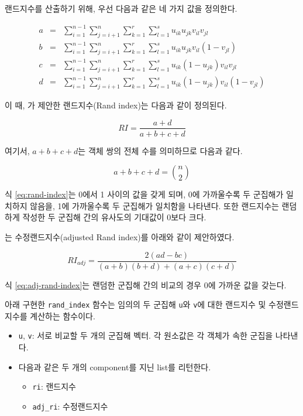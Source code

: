 \documentclass[
]{book}
\providecommand{\tightlist}{%
  \setlength{\itemsep}{0pt}\setlength{\parskip}{0pt}}
\begin{document}
랜드지수를 산출하기 위해, 우선 다음과 같은 네 가지 값을 정의한다.

\begin{eqnarray*}
a &=& \sum_{i = 1}^{n - 1} \sum_{j = i + 1}^{n} \sum_{k = 1}^{r} \sum_{l = 1}^{s} u_{ik} u_{jk} v_{il} v_{jl}\\
b &=& \sum_{i = 1}^{n - 1} \sum_{j = i + 1}^{n} \sum_{k = 1}^{r} \sum_{l = 1}^{s} u_{ik} u_{jk} v_{il} (1 - v_{jl})\\
c &=& \sum_{i = 1}^{n - 1} \sum_{j = i + 1}^{n} \sum_{k = 1}^{r} \sum_{l = 1}^{s} u_{ik} (1 - u_{jk}) v_{il} v_{jl}\\
d &=& \sum_{i = 1}^{n - 1} \sum_{j = i + 1}^{n} \sum_{k = 1}^{r} \sum_{l = 1}^{s} u_{ik} (1 - u_{jk}) v_{il} (1 - v_{jl})
\end{eqnarray*}

이 때, \citet{rand1971objective} 가 제안한 랜드지수(Rand index)는 다음과 같이 정의된다.

\begin{equation}
RI = \frac{a + d}{a + b + c + d} \label{eq:rand-index}
\end{equation}

여기서, \(a + b + c + d\)는 객체 쌍의 전체 수를 의미하므로 다음과 같다.

\begin{equation*}
a + b + c + d = {n \choose 2}
\end{equation*}

식 \eqref{eq:rand-index}는 0에서 1 사이의 값을 갖게 되며, 0에 가까울수록 두 군집해가 일치하지 않음을, 1에 가까울수록 두 군집해가 일치함을 나타낸다. 또한 랜드지수는 랜덤하게 작성한 두 군집해 간의 유사도의 기대값이 0보다 크다.

\citet{hubert1985comparing} 는 수정랜드지수(adjusted Rand index)를 아래와 같이 제안하였다.

\begin{equation}
RI_{adj} = \frac{2 (ad - bc)}{(a + b)(b + d) + (a + c)(c + d)} \label{eq:adj-rand-index}
\end{equation}

식 \eqref{eq:adj-rand-index}는 랜덤한 군집해 간의 비교의 경우 0에 가까운 값을 갖는다.

아래 구현한 \texttt{rand\_index} 함수는 임의의 두 군집해 \texttt{u}와 \texttt{v}에 대한 랜드지수 및 수정랜드지수를 계산하는 함수이다.

\begin{itemize}
\tightlist
\item
  \texttt{u}, \texttt{v}: 서로 비교할 두 개의 군집해 벡터. 각 원소값은 각 객체가 속한 군집을 나타낸다.
\item
  다음과 같은 두 개의 component를 지닌 list를 리턴한다.

  \begin{itemize}
  \tightlist
  \item
    \texttt{ri}: 랜드지수
  \item
    \texttt{adj\_ri}: 수정랜드지수
  \end{itemize}
\end{itemize}
\end{document}
